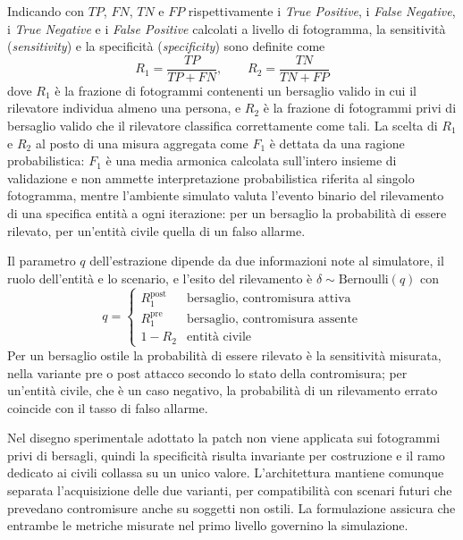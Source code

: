 \ifstampa\documentclass[a4paper,12pt,twoside,openright]{report}\else\documentclass[a4paper,12pt]{report}\fi
\newif\ifrevisione \revisionefalse
\DeclareRobustCommand{\rev}[1]{\ifrevisione{\color{blue!65!black}#1}\else#1\fi}
\begin{document}
Indicando con $\mathit{TP}$, $\mathit{FN}$, $\mathit{TN}$ e $\mathit{FP}$
rispettivamente i \textit{True Positive}, i \textit{False Negative}, i
\textit{True Negative} e i \textit{False Positive} calcolati a livello di
fotogramma, la \rev{sensitività (\textit{sensitivity}) e la specificità (\textit{specificity})} sono definite come
\begin{equation}
    R_1 = \frac{\mathit{TP}}{\mathit{TP} + \mathit{FN}}, \qquad
    R_2 = \frac{\mathit{TN}}{\mathit{TN} + \mathit{FP}}
    \label{eq:r1_r2}
\end{equation}
dove $R_1$ è la frazione di fotogrammi contenenti un bersaglio valido in cui il
rilevatore individua almeno una persona, e $R_2$ è la frazione di fotogrammi
privi di bersaglio valido che il rilevatore classifica correttamente come tali.
La scelta di \rev{$R_1$ e $R_2$ al posto di una misura aggregata come} $F_1$ è dettata da una ragione
probabilistica: $F_1$ è una media armonica calcolata sull'intero insieme di
validazione e non ammette interpretazione probabilistica riferita al singolo
fotogramma, mentre l'ambiente simulato valuta l'evento binario del rilevamento
di una specifica entità a ogni iterazione\rev{: per un bersaglio la probabilità
di essere rilevato, per un'entità civile quella di un falso allarme}.

\rev{Il parametro $q$ dell'estrazione dipende da due informazioni note al
simulatore, il ruolo dell'entità e lo scenario, e l'esito del rilevamento è
$\delta \sim \mathrm{Bernoulli}(q)$ con
\begin{equation}
    q =
    \begin{cases}
        R_1^{\text{post}} & \text{bersaglio, contromisura attiva} \\
        R_1^{\text{pre}} & \text{bersaglio, contromisura assente} \\
        1 - R_2 & \text{entità civile}
    \end{cases}
    \label{eq:q}
\end{equation}
Per un bersaglio ostile la probabilità di essere rilevato è la sensitività
misurata, nella variante pre o post attacco secondo lo stato della
contromisura; per un'entità civile, che è un caso negativo, la probabilità di
un rilevamento errato coincide con il tasso di falso allarme.}

Nel disegno sperimentale adottato la patch non viene applicata sui fotogrammi
privi di bersagli, quindi la specificità risulta invariante per costruzione e il
ramo dedicato ai civili collassa su un unico valore. L'architettura mantiene
comunque separata l'acquisizione delle due varianti, per compatibilità con
scenari futuri che prevedano contromisure anche su soggetti non ostili. La
formulazione assicura che entrambe le metriche misurate nel primo livello
governino la simulazione.
\end{document}
